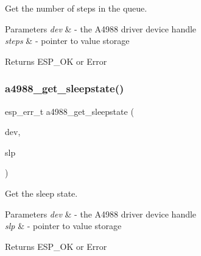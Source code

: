 Get the number of steps in the queue. 


\begin{DoxyParams}{Parameters}
{\em dev} & -\/ the A4988 driver device handle \\
\hline
{\em steps} & -\/ pointer to value storage \\
\hline
\end{DoxyParams}
\begin{DoxyReturn}{Returns}
E\+S\+P\+\_\+\+OK or Error 
\end{DoxyReturn}
\mbox{\label{group__A4988__Driver__functions_ga19ad6378ca6f643f535025921d8246f0}} 
\subsubsection{\texorpdfstring{a4988\+\_\+get\+\_\+sleepstate()}{a4988\_get\_sleepstate()}}
{\footnotesize\ttfamily esp\+\_\+err\+\_\+t a4988\+\_\+get\+\_\+sleepstate (\begin{DoxyParamCaption}\item[{\hyperlink{group__A4988__definitions_ga16590a9dd79ad8fcf4c317be2659b6c5}{A4988\+\_\+\+D\+EV}}]{dev,  }\item[{bool $\ast$}]{slp }\end{DoxyParamCaption})}



Get the sleep state. 


\begin{DoxyParams}{Parameters}
{\em dev} & -\/ the A4988 driver device handle \\
\hline
{\em slp} & -\/ pointer to value storage \\
\hline
\end{DoxyParams}
\begin{DoxyReturn}{Returns}
E\+S\+P\+\_\+\+OK or Error 
\end{DoxyReturn}
\mbox{\label{group__A4988__Driver__functions_ga326f6130f475404923b17e3ef940721d}} 
